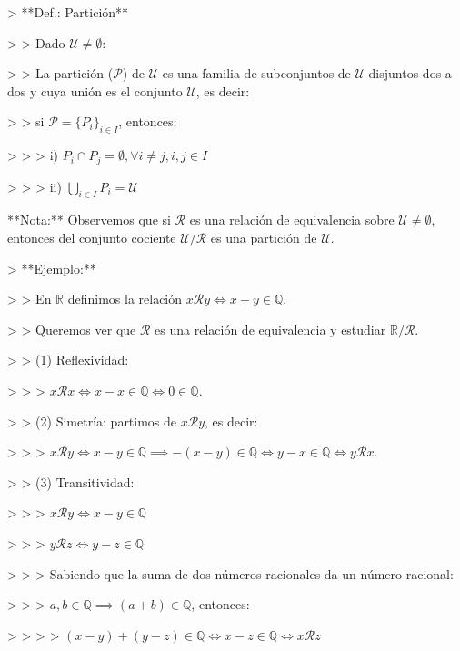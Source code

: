> **Def.: Partición**

> > Dado $\mathcal{U} \neq \emptyset$:

> > La partición ($\mathcal{P}$) de $\mathcal{U}$ es una familia de subconjuntos de $\mathcal{U}$ disjuntos dos a dos y cuya unión es el conjunto $\mathcal{U}$, es decir:

> > si $\mathcal{P} = \{{P_i}\}_{i \in I}$, entonces:

> > > i) $P_i \cap P_j = \emptyset, \forall i \neq j, i,j \in I$

> > > ii) $\bigcup_{i \in I} P_i = \mathcal{U}$

**Nota:** Observemos que si $\mathcal{R}$ es una relación de equivalencia sobre $\mathcal{U} \neq \emptyset$, entonces del conjunto cociente $\mathcal{U}/\mathcal{R}$ es una partición de $\mathcal{U}$.

> **Ejemplo:**

> > En $\mathbb{R}$ definimos la relación $x \mathcal{R} y \iff x-y \in \mathbb{Q}$.

> > Queremos ver que $\mathcal{R}$ es una relación de equivalencia y estudiar $\mathbb{R}/\mathcal{R}$.

> > (1) Reflexividad:

> > > $x \mathcal{R} x \iff x-x \in \mathbb{Q} \iff 0 \in \mathbb{Q}$. \checkmark 

> > (2) Simetría: partimos de $x \mathcal{R} y$, es decir:

> > > $x \mathcal{R} y \iff x-y \in \mathbb{Q} \implies -(x-y) \in \mathbb{Q} \iff y-x \in \mathbb{Q} \iff y \mathcal{R} x$. \checkmark

> > (3) Transitividad:

> > > $x \mathcal{R} y \iff x-y \in \mathbb{Q}$

> > > $y \mathcal{R} z \iff y-z \in \mathbb{Q}$

> > > Sabiendo que la suma de dos números racionales da un número racional:

> > > $a,b \in \mathbb{Q} \implies (a + b) \in \mathbb{Q}$, entonces:

> > > > $(x-y)+(y-z) \in \mathbb{Q} \iff x-z \in \mathbb{Q} \iff x \mathcal{R} z$ \checkmark
